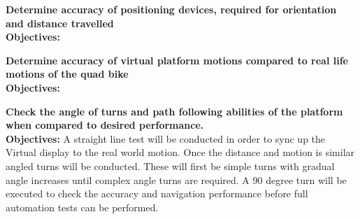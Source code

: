 \documentclass[main.tex]{subfiles}
\begin{document}
\begin{appendices}
\begin{qb}
\textbf{Determine accuracy of positioning devices, required for orientation and distance travelled}\\
\textbf{Objectives:} 
\end{qb}

\begin{qb}
\textbf{Determine accuracy of virtual platform motions compared to real life motions of the quad bike}\\
\textbf{Objectives:}
\end{qb}


\begin{qb}
\textbf{Check the angle of turns and path following abilities of the platform when compared to desired performance.}\\
\textbf{Objectives:} A straight line test will be conducted in order to sync up the Virtual display to the real world motion. Once the distance and motion is similar angled turns will be conducted. These will first be simple turns with gradual angle increases until complex angle turns are required. A 90 degree turn will be executed to check the accuracy and navigation performance before full automation tests can be performed.

\end{qb}





\end{appendices}
\end{document}
